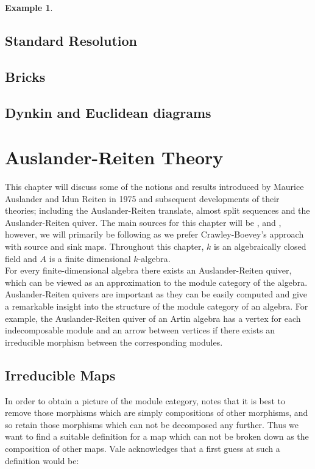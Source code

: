 \documentclass[11.5pt, twoside, a4paper, titlepage]{report}
\theoremstyle{definition}
\newtheorem{eg}[mydef]{Example}
\theoremstyle{plain}
\begin{document}
\begin{eg}
\end{eg}





\section{Standard Resolution}

\section{Bricks}

\section{Dynkin and Euclidean diagrams}





\chapter{Auslander-Reiten Theory}
This chapter will discuss some of the notions and results introduced by Maurice Auslander and Idun Reiten in 1975 and subsequent developments of their theories; including the Auslander-Reiten translate, almost split sequences and the Auslander-Reiten quiver. The main sources for this chapter will be \cite{CB3}, \cite{Vale} and \cite{Assem}, however, we will primarily be following \cite{CB3} as we prefer Crawley-Boevey's approach with source and sink maps. Throughout this chapter, $k$ is an algebraically closed field and $A$ is a finite dimensional $k$-algebra.\\
For every finite-dimensional algebra there exists an Auslander-Reiten quiver, which can be viewed as an approximation to the module category of the algebra. Auslander-Reiten quivers are important as they can be easily computed and give a remarkable insight into the structure of the module category of an algebra. For example, the Auslander-Reiten quiver of an Artin algebra has a vertex for each indecomposable module and an arrow between vertices if there exists an irreducible morphism between the corresponding modules. \cite{AR}

\section{Irreducible Maps}
In order to obtain a picture of the module category, \cite{Vale} notes that it is best to remove those morphisms which are simply compositions of other morphisms, and so retain those morphisms which can not be decomposed any further. Thus we want to find a suitable definition for a map which can not be broken down as the composition of other maps. Vale acknowledges that a first guess at such a definition would be:
\end{document}

